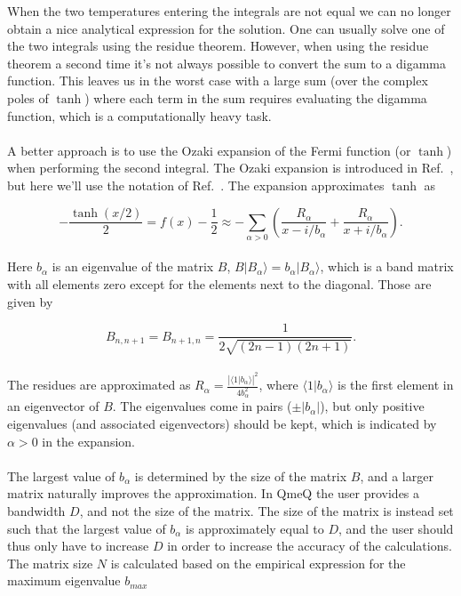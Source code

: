 \documentclass{article}
\newcommand{\ket}[1]{\ensuremath{|#1\rangle}}
\begin{document}
When the two temperatures entering the integrals are not equal we can no longer obtain a nice analytical expression for the solution. One can usually solve one of the two integrals using the residue theorem. However, when using the residue theorem a second time it's not always possible to convert the sum to a digamma function. This leaves us in the worst case with a large sum (over the complex poles of $\tanh$) where each term in the sum requires evaluating the digamma function, which is a computationally heavy task. 
\\
\\
A better approach is to use the Ozaki expansion of the Fermi function (or $\tanh$) when performing the second integral. The Ozaki expansion is introduced in Ref.~\cite{ozaki2007continued}, but here we'll use the notation of Ref.~\cite{karrasch2010finite}. The expansion approximates $\tanh$ as

\begin{equation}
    -\frac{\tanh(x/2)}{2} = f(x) - \frac{1}{2} \approx -\sum_{\alpha>0}\left( \frac{R_\alpha}{x-i/b_\alpha}+\frac{R_\alpha}{x+i/b_\alpha}\right ).
\end{equation}
\\
Here $b_\alpha$ is an eigenvalue of the matrix $B$, $B\ket{B_\alpha}=b_\alpha\ket{B_\alpha}$, which is a band matrix with all elements zero except for the elements next to the diagonal. Those are given by

\begin{equation}
    B_{n,n+1} = B_{n+1,n}=\frac{1}{2\sqrt{(2n-1)(2n+1)}}.
\end{equation}
\\
The residues are approximated as $R_\alpha=\frac{|\langle 1\ket{b_\alpha}|^2}{4b_\alpha^2}$, where $\langle 1\ket{b_\alpha}$ is the first element in an eigenvector of $B$. The eigenvalues come in pairs ($\pm|b_\alpha|$), but only positive eigenvalues (and associated eigenvectors) should be kept, which is indicated by $\alpha>0$ in the expansion. 
\\
\\
The largest value of $b_\alpha$ is determined by the size of the matrix $B$, and a larger matrix naturally improves the approximation. In QmeQ the user provides a bandwidth $D$, and not the size of the matrix. The size of the matrix is instead set such that the largest value of $b_\alpha$ is approximately equal to $D$, and the user should thus only have to increase $D$ in order to increase the accuracy of the calculations. The matrix size $N$ is calculated based on the empirical expression for the maximum eigenvalue $b_{max}$
\end{document}
